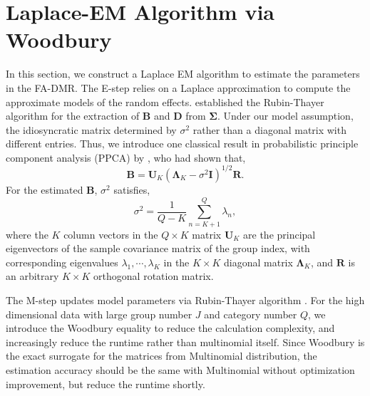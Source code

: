 \section{Laplace-EM Algorithm via Woodbury}
\label{sec: EM-wb}

In this section, we construct a Laplace EM algorithm to estimate the parameters in the FA-DMR. The E-step relies on a Laplace approximation to compute the approximate models of the random effects. \citet{Rubin1982} established the Rubin-Thayer algorithm for the extraction of $\mathbf{B}$ and $\mathbf{D}$ from $\bm{\Sigma}$. Under our model assumption, the idiosyncratic matrix determined by $\sigma^{2}$ rather than a diagonal matrix with different entries. Thus, we introduce one classical result in probabilistic principle component analysis (PPCA) by \citet{Tipping1999}, who had shown that,
\begin{equation}
    \mathbf{B}=\mathbf{U}_{K}\left(\bm{\Lambda}_{K}-\sigma^{2}\mathbf{I}\right)^{1/2}\mathbf{R}.
    \label{eq:tipping-ppca_b}
\end{equation}
For the estimated $\mathbf{B}$, $\sigma^{2}$ satisfies,
\begin{equation}
    \sigma^{2}=\frac{1}{Q-K}\sum_{n=K+1}^{Q}\lambda_{n},
    \label{eq:tipping-ppca_sigma}
\end{equation}
where the $K$ column vectors in the $Q\times K$ matrix $\mathbf{U}_{K}$ are the principal eigenvectors of the sample covariance matrix of the group index, with corresponding eigenvalues $\lambda_{1},\cdots,\lambda_{K}$ in the $K\times K$ diagonal matrix $\bm{\Lambda}_{K}$, and $\mathbf{R}$ is an arbitrary $K\times K$ orthogonal rotation matrix.

The M-step updates model parameters via Rubin-Thayer algorithm \citep{Rubin1982}. For the high dimensional data with large group number $J$ and category number $Q$, we introduce the Woodbury equality to reduce the calculation complexity, and increasingly reduce the runtime rather than multinomial itself. Since Woodbury is the exact surrogate for the matrices from Multinomial distribution, the estimation accuracy should be the same with Multinomial without optimization improvement, but reduce the runtime shortly. 

